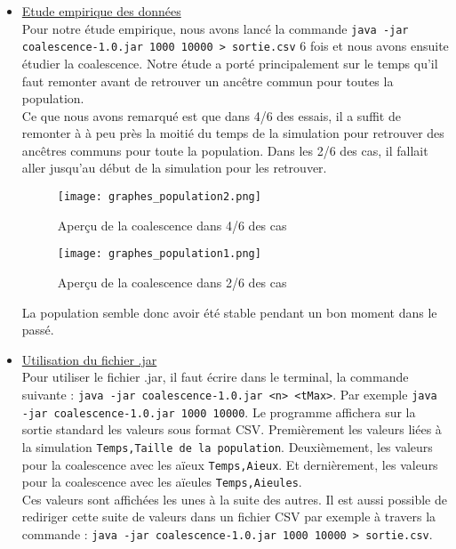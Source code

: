\documentclass[11pt]{article}
\begin{document}
\begin{itemize}
		
		\item \underline{Etude empirique des données} \vspace{0.2cm}\\
		Pour notre étude empirique, nous avons lancé la commande
		\texttt{java -jar coalescence-1.0.jar 1000 10000 > sortie.csv} 6 fois et nous avons ensuite étudier la coalescence. Notre étude a porté principalement sur le temps qu'il faut remonter avant de retrouver un ancêtre commun pour toutes la population. \\
		
		Ce que nous avons remarqué est que dans 4/6 des essais, il a suffit de remonter à à peu près la moitié du temps de la simulation pour retrouver des ancêtres communs pour toute la population. Dans les 2/6 des cas, il fallait aller jusqu'au début de la simulation pour les retrouver.\\
		
		\begin{figure}[H]
			\centering
			\texttt{[image: graphes\_population2.png]}
			\caption{Aperçu de la coalescence dans 4/6 des cas}
		\end{figure}
		
		\begin{figure}[H]
			\centering
			\texttt{[image: graphes\_population1.png]}
			\caption{Aperçu de la coalescence dans 2/6 des cas}
		\end{figure}
		
		La population semble donc avoir été stable pendant un bon moment dans le passé.
		
		
		\item \underline{Utilisation du fichier .jar} \vspace{0.2cm}\\
		Pour utiliser le fichier .jar, il faut écrire dans le terminal, la commande suivante : \texttt{java -jar coalescence-1.0.jar <n> <tMax>}. Par exemple \texttt{java -jar coalescence-1.0.jar 1000 10000}. Le programme affichera sur la sortie standard les valeurs sous format CSV. Premièrement les valeurs liées à la simulation \texttt{Temps,Taille de la population}. Deuxièmement, les valeurs pour la coalescence avec les aïeux \texttt{Temps,Aieux}. Et dernièrement, les valeurs pour la coalescence avec les aïeules \texttt{Temps,Aieules}. \\
		
		Ces valeurs sont affichées les unes à la suite des autres. Il est aussi possible de rediriger cette suite de valeurs dans un fichier CSV par exemple à travers la commande : \texttt{java -jar coalescence-1.0.jar 1000 10000 > sortie.csv}.
		

\end{itemize}
\end{document}
